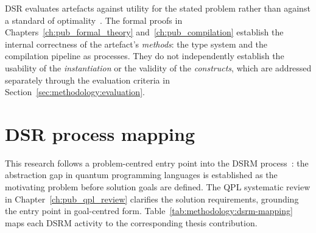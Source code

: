DSR evaluates artefacts against utility for the stated problem rather than against a standard of optimality~\cite{Hevner2004DesignScienceIS}.
The formal proofs in Chapters~\ref{ch:pub_formal_theory} and~\ref{ch:pub_compilation} establish the internal correctness of the artefact's \textit{methods}: the type system and the compilation pipeline as processes.
They do not independently establish the usability of the \textit{instantiation} or the validity of the \textit{constructs}, which are addressed separately through the evaluation criteria in Section~\ref{sec:methodology:evaluation}.


\section{DSR process mapping}\label{sec:methodology:process}
This research follows a problem-centred entry point into the DSRM process~\cite{Peffers2007DSRM}: the abstraction gap in quantum programming languages is established as the motivating problem before solution goals are defined.
The QPL systematic review in Chapter~\ref{ch:pub_qpl_review} clarifies the solution requirements, grounding the entry point in goal-centred form.
Table~\ref{tab:methodology:dsrm-mapping} maps each DSRM activity to the corresponding thesis contribution.

